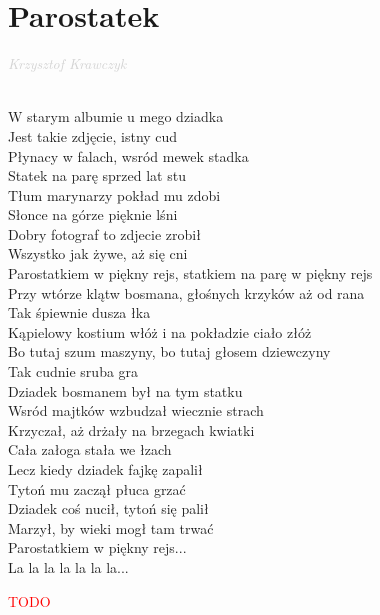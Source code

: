 \documentclass[a5paper, 10pt]{book}
\begin{document}
\section{Parostatek}\textcolor{lightgray}{\textit{Krzysztof Krawczyk}}\\~\\
\begin{minipage}[t]{0.8\textwidth}
W starym albumie u mego dziadka\\
Jest takie zdjęcie, istny cud\\
Płynacy w falach, wsród mewek stadka\\
Statek na parę sprzed lat stu\\

Tłum marynarzy pokład mu zdobi\\
Słonce na górze pięknie lśni\\
Dobry fotograf to zdjecie zrobił\\
Wszystko jak żywe, aż się cni\\

\hspace*{5mm}Parostatkiem w piękny rejs, statkiem na parę w piękny rejs\\
\hspace*{5mm}Przy wtórze klątw bosmana, głośnych krzyków aż od rana\\
\hspace*{5mm}Tak śpiewnie dusza łka\\

\hspace*{5mm}Kąpielowy kostium włóż i na pokładzie ciało złóż\\
\hspace*{5mm}Bo tutaj szum maszyny, bo tutaj głosem dziewczyny\\
\hspace*{5mm}Tak cudnie sruba gra\\

Dziadek bosmanem był na tym statku\\
Wsród majtków wzbudzał wiecznie strach\\
Krzyczał, aż drżały na brzegach kwiatki\\
Cała załoga stała we łzach\\

Lecz kiedy dziadek fajkę zapalił\\
Tytoń mu zaczął płuca grzać\\
Dziadek coś nucił, tytoń się palił\\
Marzył, by wieki mogł tam trwać\\

\hspace*{5mm}Parostatkiem w piękny rejs...\\

\hspace*{5mm}La la la la la la la...\\
\end{minipage}
\begin{minipage}[t]{0.2\textwidth}
\textcolor{red}{TODO}\\
\end{minipage}
\end{document}
